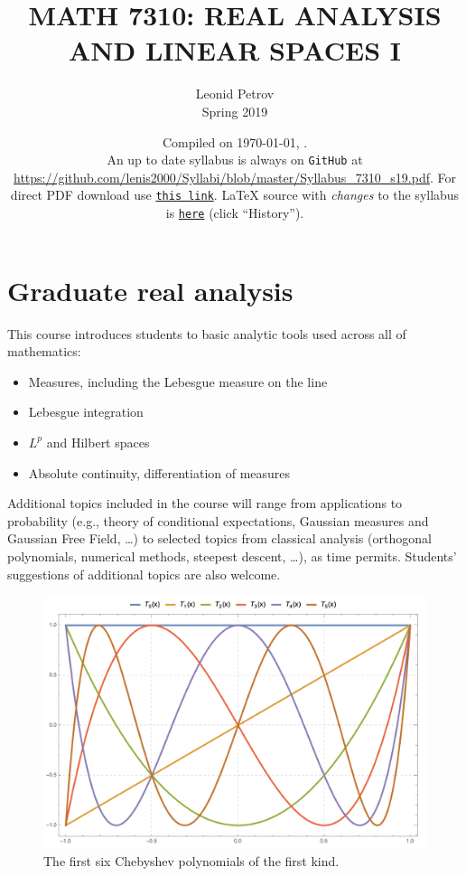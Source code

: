 \documentclass[oneside,11pt]{amsart}
\begin{document}
\title[MATH 7310: REAL ANALYSIS AND LINEAR SPACES I]{MATH 7310: REAL ANALYSIS AND LINEAR SPACES I}
\author{Leonid Petrov\\Spring 2019}
\date{Compiled on \today, \currenttime.\\An up to date syllabus is always on \texttt{GitHub} at \url{https://github.com/lenis2000/Syllabi/blob/master/Syllabus_7310_s19.pdf}. For direct PDF download use \href{https://github.com/lenis2000/Syllabi/raw/master/Syllabus_7310_s19.pdf}{\texttt{this link}}.
	\LaTeX{} source with \textit{changes} to the syllabus is \href{https://github.com/lenis2000/Syllabi/blob/master/Syllabus_7310_s19.tex}{\texttt{here}}
(click ``History'').}
\maketitle

\bigskip

\section{Graduate real analysis}
\bigskip

This course introduces students to basic analytic tools used across all of mathematics:
\begin{itemize}
	\item Measures, including the Lebesgue measure on the line
	\item Lebesgue integration
	\item $L^p$ and Hilbert spaces
	\item Absolute continuity, differentiation of measures
\end{itemize}

Additional topics included in the course will range from applications to 
probability (e.g., theory of conditional expectations, Gaussian measures and Gaussian Free Field, \ldots)
to selected topics from classical analysis (orthogonal polynomials, numerical methods, steepest descent, \ldots),
as time permits.
Students' suggestions of additional topics are also welcome.

\begin{figure}[h]
	\includegraphics[height=.32\textwidth]{img/chebyshev.png}
	\caption{The first six Chebyshev polynomials of the first kind.}
\end{figure}
\end{document}
